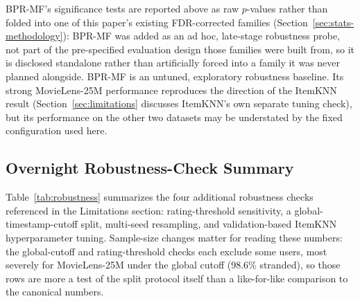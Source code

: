\documentclass[11pt,a4paper]{article}
\begin{document}
BPR-MF's significance tests are reported above as raw $p$-values rather
than folded into one of this paper's existing FDR-corrected families
(Section~\ref{sec:stats-methodology}): BPR-MF was added as an ad hoc,
late-stage robustness probe, not part of the pre-specified evaluation
design those families were built from, so it is disclosed standalone
rather than artificially forced into a family it was never planned
alongside. BPR-MF is an untuned, exploratory robustness baseline. Its
strong MovieLens-25M performance reproduces the direction of the
ItemKNN result (Section~\ref{sec:limitations} discusses ItemKNN's own
separate tuning check), but its performance on the other two datasets
may be understated by the fixed configuration used here.

\subsection{Overnight Robustness-Check Summary}
\label{sec:robustness}

Table~\ref{tab:robustness} summarizes the four additional robustness
checks referenced in the Limitations section: rating-threshold
sensitivity, a global-timestamp-cutoff split, multi-seed resampling,
and validation-based ItemKNN hyperparameter tuning. Sample-size changes
matter for reading these numbers: the global-cutoff and rating-threshold
checks each exclude some users, most severely for MovieLens-25M under
the global cutoff (98.6\% stranded), so those rows are more a test of
the split protocol itself than a like-for-like comparison to the
canonical numbers.
\end{document}

